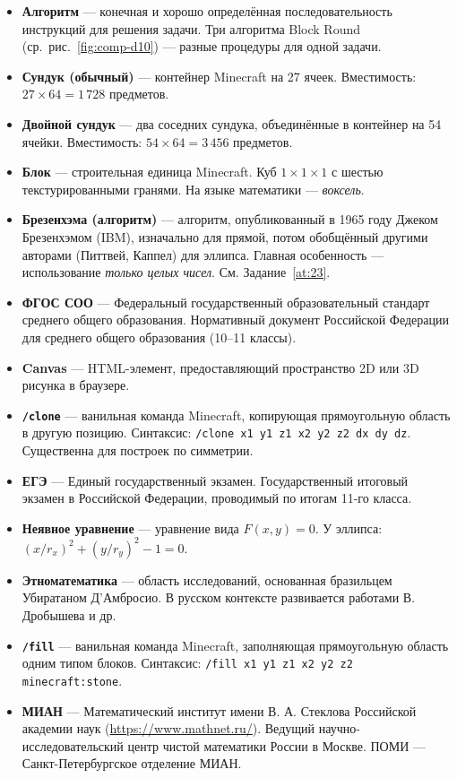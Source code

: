 \documentclass[12pt,a4paper]{scrartcl}
\newcommand{\code}[1]{\texttt{\small #1}}
\newcommand{\acc}[1]{\textcolor{accent}{\textbf{#1}}}
\newcommand{\cmd}[1]{\textcolor{earth}{\texttt{\small #1}}}
\begin{document}
\begin{itemize}[leftmargin=1.4em,itemsep=0.3em,topsep=0.3em]
  \item \acc{Алгоритм} --- конечная и хорошо определённая последовательность инструкций для решения задачи. Три алгоритма Block Round (ср.\ рис.~\ref{fig:comp-d10}) --- разные процедуры для одной задачи.
  \item \acc{Сундук (обычный)} --- контейнер Minecraft на 27 ячеек. Вместимость: $27 \times 64 = 1\,728$ предметов.
  \item \acc{Двойной сундук} --- два соседних сундука, объединённые в контейнер на 54 ячейки. Вместимость: $54 \times 64 = 3\,456$ предметов.
  \item \acc{Блок} --- строительная единица Minecraft. Куб $1\times1\times1$ с шестью текстурированными гранями. На языке математики --- \emph{воксель}.
  \item \acc{Брезенхэма (алгоритм)} --- алгоритм, опубликованный в 1965 году Джеком Брезенхэмом (IBM), изначально для прямой, потом обобщённый другими авторами (Питтвей, Каппел) для эллипса. Главная особенность --- использование \emph{только целых чисел}. См. Задание~\ref{at:23}.
  \item \acc{ФГОС СОО} --- Федеральный государственный образовательный стандарт среднего общего образования. Нормативный документ Российской Федерации для среднего общего образования (10--11 классы).
  \item \acc{Canvas} --- HTML-элемент, предоставляющий пространство 2D или 3D рисунка в браузере.
  \item \acc{\code{/clone}} --- ванильная команда Minecraft, копирующая прямоугольную область в другую позицию. Синтаксис: \cmd{/clone x1 y1 z1 x2 y2 z2 dx dy dz}. Существенна для построек по симметрии.
  \item \acc{ЕГЭ} --- Единый государственный экзамен. Государственный итоговый экзамен в Российской Федерации, проводимый по итогам 11-го класса.
  \item \acc{Неявное уравнение} --- уравнение вида $F(x, y) = 0$. У эллипса: $(x/r_x)^2 + (y/r_y)^2 - 1 = 0$.
  \item \acc{Этноматематика} --- область исследований, основанная бразильцем Убиратаном Д'Амбросио. В русском контексте развивается работами В. Дробышева и др.
  \item \acc{\code{/fill}} --- ванильная команда Minecraft, заполняющая прямоугольную область одним типом блоков. Синтаксис: \cmd{/fill x1 y1 z1 x2 y2 z2 minecraft:stone}.
  \item \acc{МИАН} --- Математический институт имени В. А. Стеклова Российской академии наук (\url{https://www.mathnet.ru/}). Ведущий научно-исследовательский центр чистой математики России в Москве. ПОМИ --- Санкт-Петербургское отделение МИАН.

\end{itemize}
\end{document}
